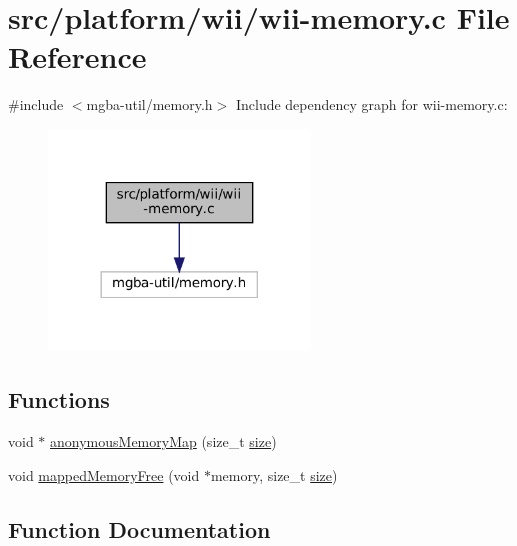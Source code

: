 \hypertarget{wii-memory_8c}{}\section{src/platform/wii/wii-\/memory.c File Reference}
\label{wii-memory_8c}
{\ttfamily \#include $<$mgba-\/util/memory.\+h$>$}\newline
Include dependency graph for wii-\/memory.c\+:
\nopagebreak
\begin{figure}[H]
\begin{center}
\leavevmode
\includegraphics[width=197pt]{wii-memory_8c__incl}
\end{center}
\end{figure}
\subsection*{Functions}
\begin{DoxyCompactItemize}
\item 
void $\ast$ \mbox{\hyperlink{wii-memory_8c_a5d8b8a54c5a5972efba2981636430417}{anonymous\+Memory\+Map}} (size\+\_\+t \mbox{\hyperlink{ioapi_8h_a014d89bd76f74ef3a29c8f04b473eb76}{size}})
\item 
void \mbox{\hyperlink{wii-memory_8c_a3542970c4da761e3d6985de6d36d83d3}{mapped\+Memory\+Free}} (void $\ast$memory, size\+\_\+t \mbox{\hyperlink{ioapi_8h_a014d89bd76f74ef3a29c8f04b473eb76}{size}})
\end{DoxyCompactItemize}


\subsection{Function Documentation}
\mbox{\label{wii-memory_8c_a5d8b8a54c5a5972efba2981636430417}} 
